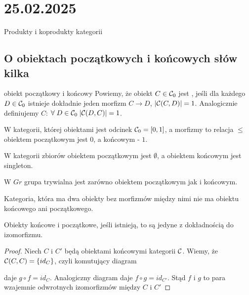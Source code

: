 \section{25.02.2025}{Produkty i koprodukty kategorii}

\subsection{O obiektach początkowych i końcowych słów kilka}

\begin{definition}{obiekt początkowy i końcowy}{}
  Powiemy, że obiekt $C\in \mathcal{C}_0$ jest , jeśli dla każdego $D\in\mathcal{C}_0$ istnieje dokładnie jeden morfizm $C\to D$, $|\mathcal{C}(C, D)|=1$. Analogicznie definiujemy  $C$: $\forall\;D\in\mathcal{C}_0\;|\mathcal{C}(D, C)|=1$.
\end{definition}

\begin{example}[m]
  \item W kategorii, której obiektami jest odcinek $\mathcal{C}_0=[0,1]$, a morfizmy to relacja $\leq$ obiektem początkowym jest $0$, a końcowym - $1$.
  \item W kategorii zbiorów obiektem początkowym jest $\emptyset$, a obiektem końcowym jest singleton.
  \item W $Gr$ grupa trywialna jest zarówno obiektem początkowym jak i końcowym.
  \item Kategoria, która ma dwa obiekty bez morfizmów między nimi nie ma obiektu końcowego ani początkowego.
\end{example}

\begin{fact}{}{}
  Obiekty końcowe i początkowe, jeśli istnieją, to są jedyne z dokładnością do izomorfizmu.
\end{fact}

\begin{proof}
  Niech $C$ i $C'$ będą obiektami końcowymi kategorii $\mathcal{C}$. Wiemy, że $\mathcal{C}(C, C)=\{id_C\}$, czyli komutujący diagram
  \begin{center}
  \end{center}
  daje $g\circ f=id_C$. Analogiczny diagram daje $f\circ g=id_{C'}$. Stąd $f$ i $g$ to para wzajemnie odwrotnych izomorfizmów między $C$ i $C'$
\end{proof}

